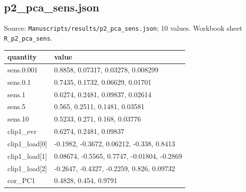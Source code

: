 \subsection*{p2\_pca\_sens.json}
\noindent\small Source: \nolinkurl{Manuscripts/results/p2_pca_sens.json}; 10 values. Workbook sheet \texttt{R\_p2\_pca\_sens}.\par
{\scriptsize\begin{longtable}{p{}p{}}\toprule\textbf{quantity} & \textbf{value}\\\midrule\endhead
{}sens.0.001 & 0.8858, 0.07317, 0.03278, 0.008299\\
{}sens.0.1 & 0.7435, 0.1732, 0.06629, 0.01701\\
{}sens.1 & 0.6274, 0.2481, 0.09837, 0.02614\\
{}sens.5 & 0.565, 0.2511, 0.1481, 0.03581\\
{}sens.10 & 0.5233, 0.271, 0.168, 0.03776\\
{}clip1\_evr & 0.6274, 0.2481, 0.09837\\
{}clip1\_load[0] & -0.1982, -0.3672, 0.06212, -0.338, 0.8413\\
{}clip1\_load[1] & 0.08674, -0.5565, 0.7747, -0.01804, -0.2869\\
{}clip1\_load[2] & -0.2647, -0.4327, -0.2259, 0.826, 0.09732\\
{}cor\_PC1 & 0.4828, 0.454, 0.9791\\
\bottomrule\end{longtable}}

